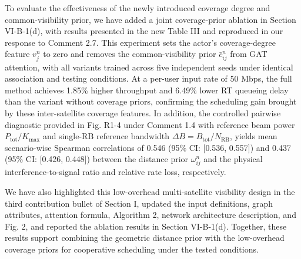 \documentclass[11pt,a4paper]{article}
\newcommand{\qrev}[1]{{\color{qinrev}#1}}
\begin{document}
To evaluate the effectiveness of the newly introduced coverage degree and common-visibility prior, we have added a joint coverage-prior ablation in \qrev{Section VI-B-1(d)}, with results presented in the new Table III and reproduced in our response to Comment 2.7. This experiment sets the actor's coverage-degree feature $v_j^n$ to zero and removes the common-visibility prior $\bar c_{ij}^n$ from GAT attention, with all variants trained across five independent seeds under identical association and testing conditions. At a per-user input rate of 50 Mbps, the full method achieves 1.85\% higher throughput and 6.49\% lower RT queueing delay than the variant without coverage priors, confirming the scheduling gain brought by these inter-satellite coverage features. In addition, the controlled pairwise diagnostic \qrev{provided} in Fig. R1-4 under Comment 1.4 with reference beam power $P_{\mathrm{tot}}/K_{\max}$ and single-RB reference bandwidth $\Delta B=B_{\mathrm{tot}}/N_{\mathrm{RB}}$, yields mean scenario-wise Spearman correlations of 0.546 (95\% CI: [0.536, 0.557]) and 0.437 (95\% CI: [0.426, 0.448]) between the distance prior $\omega_{ij}^n$ and the physical interference-to-signal ratio and relative rate loss, respectively.
\par

We have also highlighted this low-overhead multi-satellite visibility design in the third contribution bullet of Section I, updated the input definitions, graph attributes, attention formula, Algorithm 2, network architecture description, and Fig. 2, and reported the ablation \qrev{results in Section VI-B-1(d)}. Together, these results support combining the geometric distance prior with the low-overhead coverage priors for cooperative scheduling under the tested conditions.
\par

\end{document}
